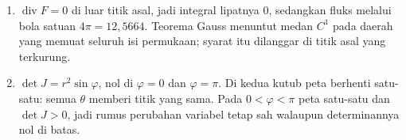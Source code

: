\begin{enumerate}[label=\textbf{15.\arabic*}]
  \item $\operatorname{div}F=0$ di luar titik asal, jadi integral lipatnya $0$,
        sedangkan fluks melalui bola satuan $4\pi=12{,}5664$. Teorema Gauss
        menuntut medan $C^{1}$ pada daerah yang memuat seluruh isi permukaan;
        syarat itu dilanggar di titik asal yang terkurung.

  \item $\det J=r^{2}\sin\varphi$, nol di $\varphi=0$ dan $\varphi=\pi$. Di kedua
        kutub peta berhenti satu-satu: semua $\theta$ memberi titik yang sama.
        Pada $0<\varphi<\pi$ peta satu-satu dan $\det J>0$, jadi rumus perubahan
        variabel tetap sah walaupun determinannya nol di batas.
\end{enumerate}
